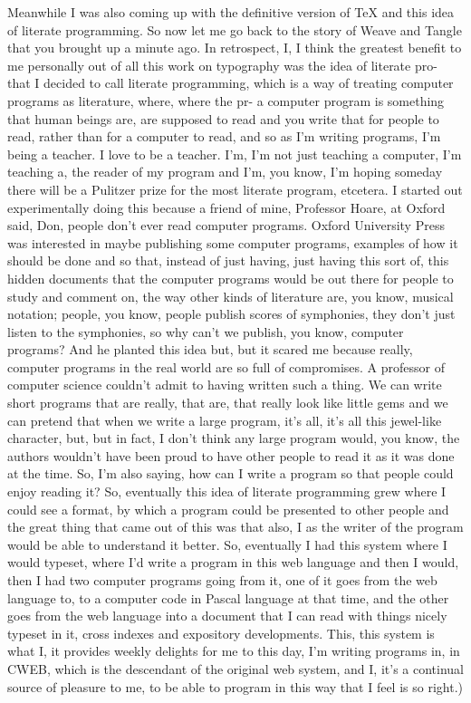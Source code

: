 \documentclass[]{article}
\begin{document}
Meanwhile I was also coming up with the definitive version of TeX and
this idea of literate programming. So now let me go back to the story of
Weave and Tangle that you brought up a minute ago. In retrospect, I, I
think the greatest benefit to me personally out of all this work on
typography was the idea of literate pro- that I decided to call literate
programming, which is a way of treating computer programs as literature,
where, where the pr- a computer program is something that human beings
are, are supposed to read and you write that for people to read, rather
than for a computer to read, and so as I'm writing programs, I'm being a
teacher. I love to be a teacher. I'm, I'm not just teaching a computer,
I'm teaching a, the reader of my program and I'm, you know, I'm hoping
someday there will be a Pulitzer prize for the most literate program,
etcetera. I started out experimentally doing this because a friend of
mine, Professor Hoare, at Oxford said, Don, people don't ever read
computer programs. Oxford University Press was interested in maybe
publishing some computer programs, examples of how it should be done and
so that, instead of just having, just having this sort of, this hidden
documents that the computer programs would be out there for people to
study and comment on, the way other kinds of literature are, you know,
musical notation; people, you know, people publish scores of symphonies,
they don't just listen to the symphonies, so why can't we publish, you
know, computer programs? And he planted this idea but, but it scared me
because really, computer programs in the real world are so full of
compromises. A professor of computer science couldn't admit to having
written such a thing. We can write short programs that are really, that
are, that really look like little gems and we can pretend that when we
write a large program, it's all, it's all this jewel-like character,
but, but in fact, I don't think any large program would, you know, the
authors wouldn't have been proud to have other people to read it as it
was done at the time. So, I'm also saying, how can I write a program so
that people could enjoy reading it? So, eventually this idea of literate
programming grew where I could see a format, by which a program could be
presented to other people and the great thing that came out of this was
that also, I as the writer of the program would be able to understand it
better. So, eventually I had this system where I would typeset, where
I'd write a program in this web language and then I would, then I had
two computer programs going from it, one of it goes from the web
language to, to a computer code in Pascal language at that time, and the
other goes from the web language into a document that I can read with
things nicely typeset in it, cross indexes and expository developments.
This, this system is what I, it provides weekly delights for me to this
day, I'm writing programs in, in CWEB, which is the descendant of the
original web system, and I, it's a continual source of pleasure to me,
to be able to program in this way that I feel is so right.)
\end{document}
